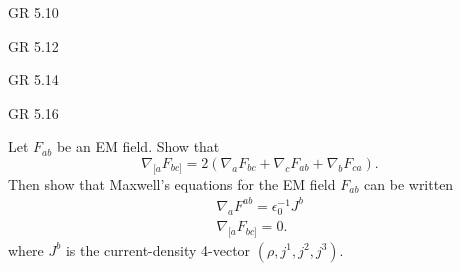 \documentclass[minion]{homework}
\begin{document}
\begin{aproblems}

\hproblem GR 5.10

\hproblem GR 5.12

\hproblem GR 5.14

\hproblem GR 5.16

\hproblem Let $F_{ab}$ be an EM field. Show that
\[
\nabla_{[a} F_{bc]} = 2(\nabla_a F_{bc} + \nabla_{c} F_{ab} + \nabla_{b}F_{ca}).
\]
Then show that Maxwell's equations for the EM field $F_{ab}$ can be written
\begin{align}
\nabla_a F^{ab} = \epsilon_0^{-1} J^b\\
\nabla_{[a} F_{bc]} = 0.
\end{align}
where $J^b$ is the current-density 4-vector $(\rho,j^1,j^2,j^3)$.

\end{aproblems}
\end{document}
